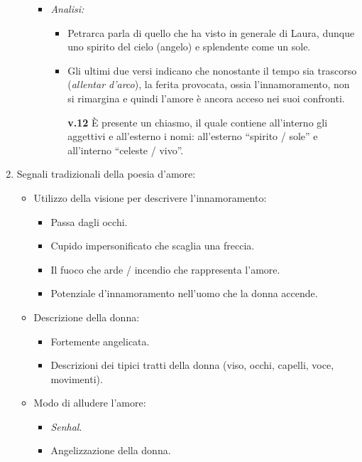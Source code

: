 \documentclass{article}
\begin{document}
\begin{enumerate}
\begin{enumerate}[label=]
\begin{itemize}[label=]
                    \item \textit{Analisi:}
                        \begin{itemize}
                            \item Petrarca parla di quello che ha visto in generale di Laura, dunque uno spirito del cielo (angelo) e splendente come un sole.
                            \item Gli ultimi due versi indicano che nonostante il tempo sia trascorso (\textit{allentar d’arco}), la ferita provocata, ossia l'innamoramento, non si rimargina e quindi l'amore è ancora acceso nei suoi confronti.
                            \item [\textbf{v.12}] È presente un chiasmo, il quale contiene all'interno gli aggettivi e all'esterno i nomi: all'esterno ``spirito / sole'' e all'interno ``celeste / vivo''.
                        \end{itemize}
                \end{itemize}
        \end{enumerate}

    \item Segnali tradizionali della poesia d'amore:
        \begin{itemize}[label=]
            \item Utilizzo della visione per descrivere l'innamoramento:
                \begin{itemize}
                    \item Passa dagli occhi.
                    \item Cupido impersonificato che scaglia una freccia.
                    \item Il fuoco che arde / incendio che rappresenta l'amore.
                    \item Potenziale d'innamoramento nell'uomo che la donna accende.
                \end{itemize}
            \item Descrizione della donna:
                \begin{itemize}
                    \item Fortemente angelicata.
                    \item Descrizioni dei tipici tratti della donna (viso, occhi, capelli, voce, movimenti).
                \end{itemize}
            \item Modo di alludere l'amore:
                \begin{itemize}
                    \item \textit{Senhal}.
                    \item Angelizzazione della donna.
                \end{itemize}
        \end{itemize}


\end{enumerate}
\end{document}
